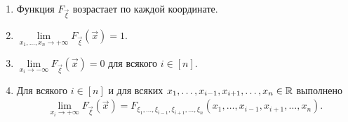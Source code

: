\documentclass[../main.tex]{subfiles}
\begin{document}
\begin{prop}\
 \begin{enumerate}
  \item Функция $ F_{\vec\xi} $ возрастает по каждой координате.
  \item $ \lim\limits_{x_1, \ldots, x_n \to +\infty}  F_{\vec\xi}(\vec x) = 1 $.
  \item $ \lim\limits_{x_i \to -\infty} F_{\vec\xi}(\vec x) = 0 $ для всякого $ i\in[n] $.
 \item Для всякого $ i \in [n] $ и для всяких $ x_1, \ldots, x_{i-1}, x_{i+1}, \ldots, x_n \in \mathbb{R} $ выполнено
  \begin{align*}
  \lim_{x_i \to +\infty} F_{\vec\xi}(\vec x) = F_{\xi_1, \ldots, \xi_{i-1}, \xi_{i+1}, \ldots, \xi_n}(x_1, \ldots, x_{i-1},x_{i+1},\ldots,x_n).
\end{align*} 
 \end{enumerate}
\end{prop}
\end{document}
